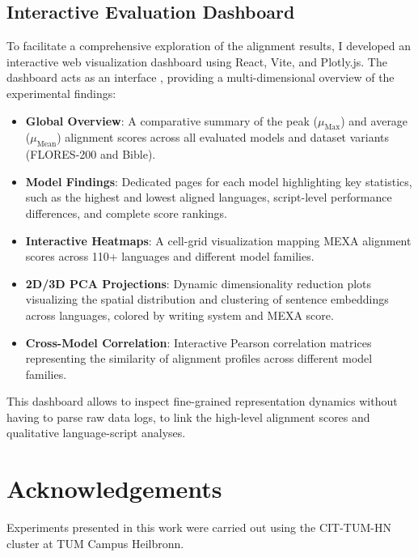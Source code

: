 \documentclass{article}
\begin{document}
\subsection{Interactive Evaluation Dashboard}
\label{subsec:dashboard}

To facilitate a comprehensive exploration of the alignment results, I developed an interactive web visualization dashboard using React, Vite, and Plotly.js. The dashboard acts as an interface , providing a multi-dimensional overview of the experimental findings:

\begin{itemize}
    \item \textbf{Global Overview}: A comparative summary of the peak ($\mu_{\text{Max}}$) and average ($\mu_{\text{Mean}}$) alignment scores across all evaluated models and dataset variants (FLORES-200 and Bible).
    \item \textbf{Model Findings}: Dedicated pages for each model highlighting key statistics, such as the highest and lowest aligned languages, script-level performance differences, and complete score rankings.
    \item \textbf{Interactive Heatmaps}: A cell-grid visualization mapping MEXA alignment scores across 110+ languages and different model families.
    \item \textbf{2D/3D PCA Projections}: Dynamic dimensionality reduction plots visualizing the spatial distribution and clustering of sentence embeddings across languages, colored by writing system and MEXA score.
    \item \textbf{Cross-Model Correlation}: Interactive Pearson correlation matrices representing the similarity of alignment profiles across different model families.
\end{itemize}

This dashboard allows  to inspect fine-grained representation dynamics without having to parse raw data logs, to link the high-level alignment scores and qualitative language-script analyses.



\section*{Acknowledgements}
Experiments presented in this work were carried out using the CIT-TUM-HN cluster at TUM Campus Heilbronn.



\end{document}
